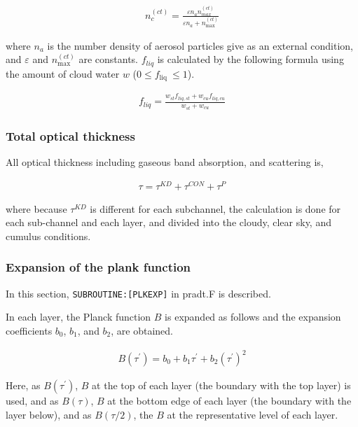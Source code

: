 \begin{eqnarray}
n_{c}^{(c t)}=\frac{\varepsilon n_{a} n_{m a x}^{(c t)}}{\varepsilon n_{a}+n_{\max }^{(c t)}}
\end{eqnarray}

where \(n_a\) is the number density of aerosol particles give as an
external condition, and \(\varepsilon\) and \(n_{\max }^{(c t)}\) are
constants. \(f_{liq}\) is calculated by the following formula using the
amount of cloud water \(w\) (\(0 \leq f_{\text {liq }} \leq 1\)).

\begin{eqnarray}
f_{l i q}=\frac{w_{s t} f_{l i q, s t}+w_{c u} f_{l i q, c u}}{w_{s t}+w_{c u}}
\end{eqnarray}

\hypertarget{total-optical-thickness}{%
\subsubsection{Total optical thickness}\label{total-optical-thickness}}

All optical thickness including gaseous band absorption, and scattering
is,

\begin{eqnarray}
\tau=\tau^{K D}+\tau^{C O N}+\tau^{P}
\end{eqnarray}

where because \(\tau^{K D}\) is different for each subchannel, the
calculation is done for each sub-channel and each layer, and divided
into the cloudy, clear sky, and cumulus conditions.

\hypertarget{expansion-of-the-plank-function}{%
\subsubsection{Expansion of the plank
function}\label{expansion-of-the-plank-function}}

In this section, \texttt{SUBROUTINE:{[}PLKEXP{]}} in pradt.F is
described.

In each layer, the Planck function \(B\) is expanded as follows and the
expansion coefficients \(b_0\), \(b_1\), and \(b_2\), are obtained.

\begin{eqnarray}
{B}\left(\tau^{\prime}\right)=b_{0}+b_{1} \tau^{\prime}+b_{2}\left(\tau^{\prime}\right)^{2}
\end{eqnarray}

Here, as \({B}\left(\tau^{\prime}\right)\), \(B\) at the top of each
layer (the boundary with the top layer) is used, and as \({B}(\tau)\),
\(B\) at the bottom edge of each layer (the boundary with the layer
below), and as \({B}(\tau / 2)\), the \(B\) at the representative level
of each layer.

